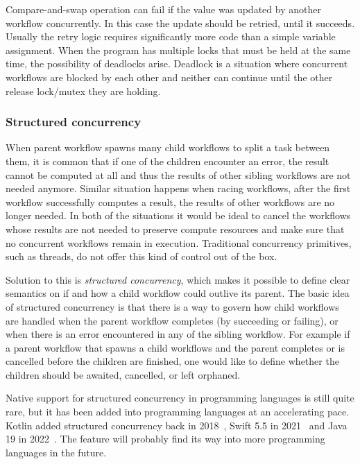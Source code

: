 Compare-and-swap operation can fail if the value was updated by another workflow concurrently. In this case the update should be retried, until it succeeds. Usually the retry logic requires significantly more code than a simple variable assignment. When the program has multiple locks that must be held at the same time, the possibility of deadlocks arise. Deadlock is a situation where concurrent workflows are blocked by each other and neither can continue until the other release lock/mutex they are holding.


\subsubsection{Structured concurrency}
When parent workflow spawns many child workflows to split a task between them, it is common that if one of the children encounter an error, the result cannot be computed at all and thus the results of other sibling workflows are not needed anymore. Similar situation happens when racing workflows, after the first workflow successfully computes a result, the results of other workflows are no longer needed. In both of the situations it would be ideal to cancel the workflows whose results are not needed to preserve compute resources and make sure that no concurrent workflows remain in execution. Traditional concurrency primitives, such as threads, do not offer this kind of control out of the box.

Solution to this is \textit{structured concurrency}, which makes it possible to define clear semantics on if and how a child workflow could outlive its parent. The basic idea of structured concurrency is that there is a way to govern how child workflows are handled when the parent workflow completes (by succeeding or failing), or when there is an error encountered in any of the sibling workflow. For example if a parent workflow that spawns a child workflows and the parent completes or is cancelled before the children are finished, one would like to define whether the children should be awaited, cancelled, or left orphaned.

Native support for structured concurrency in programming languages is still quite rare, but it has been added into programming languages at an accelerating pace. Kotlin added structured concurrency back in 2018~\cite{kotlin-sc}, Swift 5.5 in 2021~\cite{swift-sc} and Java 19 in 2022~\cite{java-sc}. The feature will probably find its way into more programming languages in the future.


